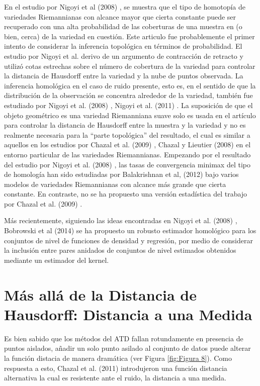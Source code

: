 En el estudio por Nigoyi et al (2008) \cite{Niyogi2008}, se muestra que el tipo de homotop\'ia de
variedades Riemannianas con alcance mayor que cierta constante puede ser recuperado con una
alta probabilidad de las coberturas de una muestra en (o bien, cerca) de la variedad en cuesti\'on.
Este articulo fue probablemente el primer intento de considerar la inferencia topol\'ogica en t\'erminos
de probabilidad. El estudio por Nigoyi et al.\cite{Niyogi2008} derivo de un argumento de contracci\'on de
retracto y utiliz\'o cotas estrechas sobre el n\'umero de cobertura de la variedad para controlar
la distancia de Hausdorff entre la variedad y la nube de puntos observada. La inferencia homol\'ogica
en el caso de ruido presente, esto es, en el sentido de que la distribuci\'on de la observaci\'on se
concentra alrededor de la variedad, tambi\'en fue estudiado por Nigoyi et al. (2008) \cite{Niyogi2008},
Nigoyi et al. (2011) \cite{Niyogi2008}. La suposici\'on de que el objeto geom\'etrico es una variedad
Riemanniana suave solo es usada en el art\'iculo para controlar la distancia de Hausdorff entre la
muestra y la variedad y no es realmente necesaria para la ``parte topol\'ogica'' del resultado, el cual
es similar a aquellos en los estudios por Chazal et al. (2009) \cite{Chazal2009d}, Chazal y Lieutier
(2008) \cite{Chazal2008} en el entorno particular de las variedades Riemannianas. Empezando por el
resultado del estudio por Nigoyi et al. (2008) \cite{Niyogi2008}, las tasas de convergencia minimax
del tipo de homolog\'ia han sido estudiadas por Balakrishnan et al, (2012) \cite{Balakrishnan2012}
bajo varios modelos de variedades Riemannianas con alcance m\'as grande que cierta constante. En contraste, no se ha propuesto una versi\'on estad\'istica del trabajo por Chazal et al. (2009)
\cite{Chazal2009d}.

M\'as recientemente, siguiendo las ideas encontradas en Nigoyi et al. (2008) \cite{Niyogi2008},
Bobrowski et al (2014) \cite{Bobrowski2014} se ha propuesto un robusto estimador homol\'ogico para los
conjuntos de nivel de funciones de densidad y regresi\'on, por medio de considerar la inclusi\'on entre
pares anidados de conjuntos de nivel estimados obtenidos mediante un estimador del kernel.

\section{M\'as all\'a de la Distancia de Hausdorff: Distancia a una Medida}

Es bien sabido que los m\'etodos del ATD fallan rotundamente en presencia de puntos aislados, a\~{n}adir
un solo punto asilado al conjunto de datos puede alterar la funci\'on distacia de manera dram\'atica
(ver Figura \ref{fig:Figura 8}). Como respuesta a esto, Chazal et al. (2011) \cite{Chazal2011b}
introdujeron una funci\'on distancia alternativa la cual es resistente ante el ruido, la distancia a una
medida.


